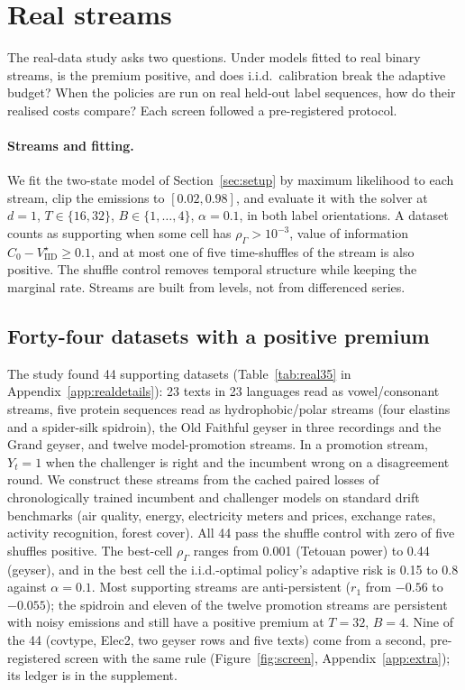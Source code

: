 \documentclass{article}
\theoremstyle{plain}
\theoremstyle{definition}
\theoremstyle{remark}
\newcommand{\Vi}{V^\star_{\mathrm{IID}}}
\newcommand{\rhoG}{\rho_\Gamma}
\begin{document}
\section{Real streams}
\label{sec:real}

The real-data study asks two questions. Under models fitted to real binary streams, is the premium positive, and does i.i.d.\ calibration break the adaptive budget? When the policies are run on real held-out label sequences, how do their realised costs compare? Each screen followed a pre-registered protocol.

\paragraph{Streams and fitting.} We fit the two-state model of Section~\ref{sec:setup} by maximum likelihood to each stream, clip the emissions to $[0.02,0.98]$, and evaluate it with the solver at $d=1$, $T\in\{16,32\}$, $B\in\{1,\dots,4\}$, $\alpha=0.1$, in both label orientations. A dataset counts as supporting when some cell has $\rhoG>10^{-3}$, value of information $C_0-\Vi\ge0.1$, and at most one of five time-shuffles of the stream is also positive. The shuffle control removes temporal structure while keeping the marginal rate. Streams are built from levels, not from differenced series.


\subsection{Forty-four datasets with a positive premium}

The study found 44 supporting datasets (Table~\ref{tab:real35} in Appendix~\ref{app:realdetails}): 23 texts in 23 languages read as vowel/consonant streams, five protein sequences read as hydrophobic/polar streams (four elastins and a spider-silk spidroin), the Old Faithful geyser in three recordings \citep{azzalini1990faithful} and the Grand geyser, and twelve model-promotion streams. In a promotion stream, $Y_t=1$ when the challenger is right and the incumbent wrong on a disagreement round. We construct these streams from the cached paired losses of chronologically trained incumbent and challenger models on standard drift benchmarks (air quality, energy, electricity meters and prices, exchange rates, activity recognition, forest cover). All 44 pass the shuffle control with zero of five shuffles positive. The best-cell $\rhoG$ ranges from 0.001 (Tetouan power) to 0.44 (geyser), and in the best cell the i.i.d.-optimal policy's adaptive risk is 0.15 to 0.8 against $\alpha=0.1$. Most supporting streams are anti-persistent ($r_1$ from $-0.56$ to $-0.055$); the spidroin and eleven of the twelve promotion streams are persistent with noisy emissions and still have a positive premium at $T=32$, $B=4$. Nine of the 44 (covtype, Elec2, two geyser rows and five texts) come from a second, pre-registered screen with the same rule (Figure~\ref{fig:screen}, Appendix~\ref{app:extra}); its ledger is in the supplement.
\end{document}
